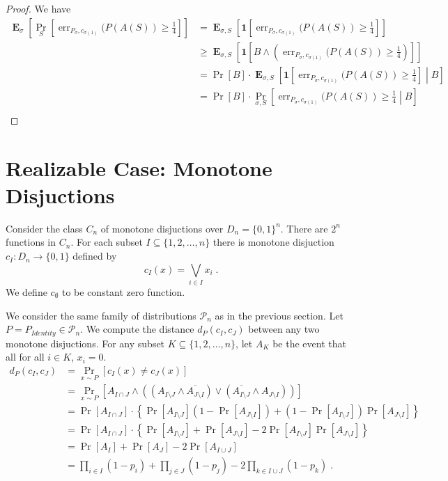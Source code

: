 \documentclass[12pt]{article}
\renewcommand{\P}{\mathcal{P}}
\newcommand{\indicator}[1]{\mathbf{1}\left[{#1}\right]}
\DeclareMathOperator{\err}{err}
\DeclareMathOperator{\Exp}{\mathbf{E}}
\begin{document}
\begin{proof}
We have
\begin{align*}
\Exp_{\sigma} \left[ \Pr_S \left[\err_{P_\sigma,c_{\sigma(1)}}(P(A(S)) \ge \frac{1}{4} \right] \right]
& = \Exp_{\sigma, S} \left[ \indicator{\err_{P_\sigma,c_{\sigma(1)}}(P(A(S)) \ge \frac{1}{4} } \right] \\
& \ge \Exp_{\sigma, S} \left[ \indicator{B \wedge \left( \err_{P_\sigma,c_{\sigma(1)}}(P(A(S)) \ge \frac{1}{4} \right) } \right] \\
& = \Pr[B] \cdot \Exp_{\sigma, S} \left[  \indicator{\err_{P_\sigma,c_{\sigma(1)}}(P(A(S)) \ge \frac{1}{4} } \middle| B \right] \\
& = \Pr[B] \cdot \Pr_{\sigma, S} \left[  \err_{P_\sigma,c_{\sigma(1)}}(P(A(S)) \ge \frac{1}{4}  \middle| B \right] \\
\end{align*}
\end{proof}

\section{Realizable Case: Monotone Disjuctions}

Consider the class $C_n$ of monotone disjuctions over $D_n = \{0,1\}^n$.
There are $2^n$ functions in $C_n$. For each subset $I \subseteq \{1,2,\dots,n\}$
there is monotone disjuction $c_I:D_n \to \{0,1\}$ defined by
$$
c_I(x) = \bigvee_{i \in I} x_i \; .
$$
We define $c_\emptyset$ to be constant zero function.

We consider the same family of distributions $\P_n$ as in the previous section.
Let $P = P_{Identity} \in \P_n$. We compute the distance $d_P(c_I, c_J)$
between any two monotone disjuctions. For any subset
$K \subseteq \{1,2,\dots,n\}$, let $A_K$ be the event that all for all $i \in K$, $x_i = 0$.
\begin{align*}
d_P(c_I, c_J)
& = \Pr_{x \sim P}[c_I(x) \neq c_J(x)] \\
& = \Pr_{x \sim P}[A_{I \cap J} \wedge ((A_{I \setminus J} \wedge \overline{A_{J \setminus I}}) \vee (\overline{A_{I \setminus J}} \wedge A_{J \setminus I} )) ] \\
& = \Pr[A_{I \cap J}] \cdot \left\{ \Pr[A_{I \setminus J}] (1 - \Pr[A_{J \setminus I}]) + (1 - \Pr[A_{I \setminus J}]) \Pr[A_{J \setminus I}] \right\} \\
& = \Pr[A_{I \cap J}] \cdot \left\{ \Pr[A_{I \setminus J}] + \Pr[A_{J \setminus I}] - 2 \Pr[A_{I \setminus J}] \Pr[A_{J \setminus I}] \right\} \\
& = \Pr[A_I] + \Pr[A_J] - 2 \Pr[A_{I \cup J}] \\
& = \prod_{i \in I} (1 - p_i) + \prod_{j \in J} (1 - p_j) - 2 \prod_{k \in I \cup J} (1 - p_k) \; . \\
\end{align*}
\end{document}

